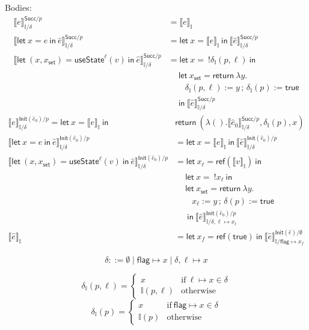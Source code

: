 \documentclass{article}
\newcommand{\mf}[1]{\mathsf{#1}}
\newcommand{\semi}{\,;\,}
\newcommand{\llrr}[1]{\llbracket #1 \rrbracket}
\newcommand{\I}{\mathbb{I}}
\newcommand{\elet}[3]{\mf{let}\ #1 = #2\ \mf{in}\ #3}
\newcommand{\eret}[1]{\mf{return}\ #1}
\newcommand{\estate}[4]{\mf{let}\ (#1, #1_{\mf{set}}) = \mf{useState}^{#2}(#3)\ \mf{in}\ #4}
\newcommand{\eref}[1]{\mf{ref}(#1)}
\newcommand{\eget}[1]{\ !#1}
\newcommand{\eset}[2]{#1 := #2}
\begin{document}
Bodies:
\begin{align*}
\llrr{e}^{\mf{Succ}/p}_{\I/\delta} &= \llrr{e}_\I\\
\llrr{\elet{x}{e}{\hat{e}}}^{\mf{Succ}/p}_{\I/\delta}
&= \elet{x}{\llrr{e}_\I}{\llrr{\hat{e}}^{\mf{Succ}/p}_{\I/\delta}}\\
\llrr{\estate{x}{\ell}{v}{\hat{e}}}^{\mf{Succ}/p}_{\I/\delta}
&= \elet{x}{\eget{\delta_\I(p, \ell)}}{\\
    &\quad\ \elet{x_\mf{set}}{\eret{\lambda y.\\
      &\qquad \eset{\delta_\I(p, \ell)}{y} 
        \semi 
        \eset{\delta_\I(p)}{\mf{true}}
      \\&\quad
    }}
  \llrr{\hat{e}}^{\mf{Succ}/p}_{\I/\delta}}
\end{align*}
\begin{align*}
\llrr{e}^{\mf{Init}(\hat{e}_0)/p}_{\I/\delta}
= \elet{x}{\llrr{e}_\I}{
  &\eret{(\lambda ().\llrr{\hat{e}_0}^{\mf{Succ}/p}_{\I/\delta},
  \delta_\I(p),x)}
}\\
\llrr{\elet{x}{e}{\hat{e}}}^{\mf{Init}(\hat{e}_0)/p}_{\I/\delta}
&= \elet{x}{\llrr{e}_\I}{\llrr{\hat{e}}^{\mf{Init}(\hat{e}_0)/p}_{\I/\delta}}\\
\llrr{\estate{x}{\ell}{v}{\hat{e}}}^{\mf{Init}(\hat{e}_0)/p}_{\I/\delta}
&= \elet{x_\ell}{\eref{\llrr{v}_\I}}{\\
  &\quad\ \elet{x}{\eget{x_\ell}}{\\
    &\quad\ \elet{x_\mf{set}}{\eret{\lambda y.\\
      &\qquad
      \eset{x_\ell}{y} \semi \eset{\delta(p)}{\mf{true}}}\\&\quad\ }{
       \llrr{\hat{e}}^{\mf{Init}(\hat{e}_0)/p}_{\I/\delta,\ell \mapsto x_\ell}
    }
  }
}\\
\llrr{\hat{e}}_\I &= \elet{x_f}{\eref{\mf{true}}}{
  \llrr{\hat{e}}^{\mf{Init}(\hat{e})/\emptyset}_{\I/\mf{flag} \mapsto x_f}
}
\end{align*}

$$\delta ::= \emptyset \mid \mf{flag} \mapsto x \mid \delta, \ell \mapsto x$$

\[\delta_\I(p, \ell) = \begin{cases}
  x & \text{if}\ \ell \mapsto x \in \delta\\
  \I(p, \ell) & \text{otherwise}
\end{cases}\]
\[\delta_\I(p) = \begin{cases}
  x & \text{if}\ \mf{flag} \mapsto x \in \delta\\
  \I(p) & \text{otherwise}
\end{cases}\]
\end{document}
